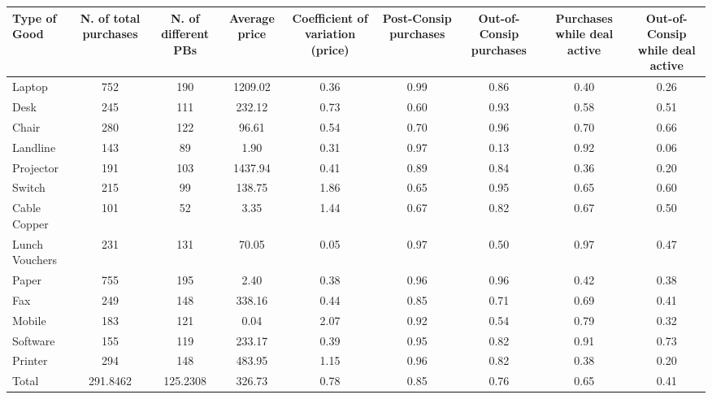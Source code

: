 {
\def\sym#1{\ifmmode^{#1}\else\(^{#1}\)\fi}
\begin{tabular}{l*{1}{cccccccc}}
\hline\hline
Type of Good                  &N. of total purchases&N. of different PBs&Average price&Coefficient of variation (price)&Post-Consip purchases&Out-of-Consip purchases&Purchases while deal active&Out-of-Consip while deal active\\
\hline
Laptop                        &         752&         190&     1209.02&        0.36&        0.99&        0.86&        0.40&        0.26\\
Desk                          &         245&         111&      232.12&        0.73&        0.60&        0.93&        0.58&        0.51\\
Chair                         &         280&         122&       96.61&        0.54&        0.70&        0.96&        0.70&        0.66\\
Landline                      &         143&          89&        1.90&        0.31&        0.97&        0.13&        0.92&        0.06\\
Projector                     &         191&         103&     1437.94&        0.41&        0.89&        0.84&        0.36&        0.20\\
Switch                        &         215&          99&      138.75&        1.86&        0.65&        0.95&        0.65&        0.60\\
Cable Copper                  &         101&          52&        3.35&        1.44&        0.67&        0.82&        0.67&        0.50\\
Lunch Vouchers                &         231&         131&       70.05&        0.05&        0.97&        0.50&        0.97&        0.47\\
Paper                         &         755&         195&        2.40&        0.38&        0.96&        0.96&        0.42&        0.38\\
Fax                           &         249&         148&      338.16&        0.44&        0.85&        0.71&        0.69&        0.41\\
Mobile                        &         183&         121&        0.04&        2.07&        0.92&        0.54&        0.79&        0.32\\
Software                      &         155&         119&      233.17&        0.39&        0.95&        0.82&        0.91&        0.73\\
Printer                       &         294&         148&      483.95&        1.15&        0.96&        0.82&        0.38&        0.20\\
Total                         &    291.8462&    125.2308&      326.73&        0.78&        0.85&        0.76&        0.65&        0.41\\
\hline\hline
\end{tabular}
}

